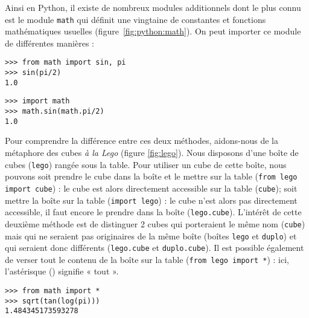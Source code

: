 Ainsi en {\sc Python}, il existe de nombreux modules additionnels dont le plus 
connu est le module {\tt math} qui définit une vingtaine de constantes et fonctions mathématiques
usuelles (figure~\ref{fig:python:math}).
On peut importer ce module de différentes manières :

\noindent\mbox{}\hfill
\begin{py}{5cm}

\begin{verbatim}
>>> from math import sin, pi
>>> sin(pi/2)
1.0
\end{verbatim}
\end{py}
\hfill
\begin{py}{5cm}
\begin{verbatim}
>>> import math
>>> math.sin(math.pi/2)
1.0
\end{verbatim}
\end{py}
\hfill\mbox{}
\vspace*{1mm}

\noindent Pour comprendre la différence entre ces deux méthodes, aidons-nous de la métaphore 
des cubes {\em à la {\sc Lego}} (figure \ref{fig:lego}). Nous disposons d'une boîte de cubes 
({\tt lego}) rangée sous la table. 
Pour utiliser un cube de cette boîte, nous pouvons soit prendre le cube 
dans la boîte et le mettre sur la table ({\tt from lego import cube}) : le cube est alors 
directement accessible sur la table ({\tt cube}); soit mettre la boîte sur la table ({\tt import lego}) :
le cube n'est alors pas directement accessible, il faut encore le prendre dans la boîte 
({\tt lego.cube}). L'intérêt de cette deuxième méthode est de distinguer 2 cubes qui porteraient
le même nom ({\tt cube}) mais qui ne seraient pas originaires de la même boîte 
(boîtes {\tt lego} et {\tt duplo}) et qui seraient donc différents 
({\tt lego.cube} et {\tt duplo.cube}). Il est possible également de verser tout le contenu 
de la boîte sur la table ({\tt from lego import *}) : ici, l'astérisque ({\tt *}) signifie « tout ».

\noindent\mbox{}\hfill
\begin{py}{5cm}
\begin{verbatim}
>>> from math import *
>>> sqrt(tan(log(pi)))
1.484345173593278
\end{verbatim}
\end{py}
\hfill\mbox{}

